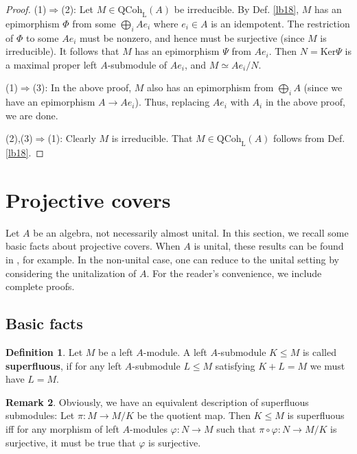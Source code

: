 \documentclass[11pt,b5paper,notitlepage]{article}
\theoremstyle{definition}
\newtheorem{df}{Definition}[section]
\newtheorem{rem}[df]{Remark}
\theoremstyle{plain}
\newcommand{\Ker}{\mathrm{Ker}}
\newcommand{\QC}{\mathrm{QCoh}_{\mathrm L}}
\numberwithin{equation}{section}
\begin{document}
\begin{proof}
(1)$\Rightarrow$(2): Let $M\in\QC(A)$ be irreducible. By Def. \ref{lb18}, $M$ has an epimorphism $\Phi$ from some $\bigoplus_i Ae_i$ where $e_i\in A$ is an idempotent. The restriction of $\Phi$ to some $Ae_i$ must be nonzero, and hence must be surjective (since $M$ is irreducible). It follows that $M$ has an epimorphism $\Psi$ from $Ae_i$. Then $N=\Ker\Psi$ is a maximal proper left $A$-submodule of $Ae_i$, and $M\simeq Ae_i/N$.

(1)$\Rightarrow$(3): In the above proof, $M$ also has an epimorphism from $\bigoplus_i A$ (since we have an epimorphism $A\rightarrow Ae_i$). Thus, replacing $Ae_i$ with $A_i$ in the above proof, we are done.

(2),(3)$\Rightarrow$(1): Clearly $M$ is irreducible. That $M\in\QC(A)$ follows from Def. \ref{lb18}.
\end{proof}





\section{Projective covers}

Let $A$ be an algebra, not necessarily almost unital. In this section, we recall some basic facts about projective covers. When $A$ is unital, these results can be found in \cite{AF-rings}, for example. In the non-unital case, one can reduce to the unital setting by considering the unitalization of $A$. For the reader’s convenience, we include complete proofs.


\subsection{Basic facts}

\begin{df}
Let $M$ be a left $A$-module. A left $A$-submodule $K\leq M$ is called \textbf{superfluous}, if for any left $A$-submodule $L\leq M$ satisfying $K+L=M$ we must have $L=M$.
\end{df}

\begin{rem}\label{lb21}
Obviously, we have an equivalent description of superfluous submodules: Let $\pi:M\rightarrow M/K$ be the quotient map. Then $K\leq M$ is superfluous iff for any morphism of left $A$-modules $\varphi:N\rightarrow M$ such that $\pi\circ\varphi:N\rightarrow M/K$ is surjective, it must be true that $\varphi$ is surjective.
\end{rem}
\end{document}
